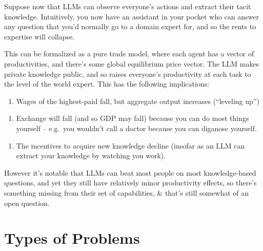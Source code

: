 \documentclass[
  10pt,
  letterpaper,
  DIV=11,
  numbers=noendperiod,
  oneside]{scrartcl}
\providecommand{\tightlist}{%
  \setlength{\itemsep}{0pt}\setlength{\parskip}{0pt}}\usepackage{longtable,booktabs,array}
\begin{document}
\begin{description}
Suppose now that LLMs can observe everyone's actions and extract their
tacit knowledge. Intuitively, you now have an assistant in your pocket
who can answer any question that you'd normally go to a domain expert
for, and so the rents to expertise will collapse.

This can be formalized as a pure trade model, where each agent has a
vector of productivities, and there's some global equilibrium price
vector. The LLM makes private knowledge public, and so raises everyone's
productivity at each task to the level of the world expert. This has the
following implications:

\begin{enumerate}
\def\labelenumi{\arabic{enumi}.}
\tightlist
\item
  Wages of the highest-paid fall, but aggregate output increases
  (``leveling up'')
\end{enumerate}

\begin{enumerate}
\def\labelenumi{\arabic{enumi}.}
\setcounter{enumi}{1}
\tightlist
\item
  Exchange will fall (and so GDP may fall) because you can do most
  things yourself -- e.g.~you wouldn't call a doctor because you can
  diganose yourself.
\end{enumerate}

\begin{enumerate}
\def\labelenumi{\arabic{enumi}.}
\setcounter{enumi}{2}
\tightlist
\item
  The incentives to acquire new knowledge decline (insofar as an LLM can
  extract your knowledge by watching you work).
\end{enumerate}

However it's notable that LLMs can beat most people on most
knowledge-based questions, and yet they still have relatively minor
productivity effects, so there's something missing from their set of
capabilities, \& that's still somewhat of an open question.
\end{description}

\newpage

\section{Types of Problems}\label{types-of-problems}
\end{document}
